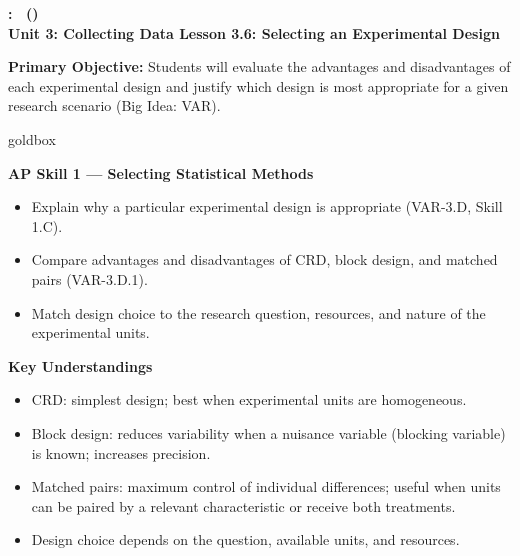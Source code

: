 \documentclass[10pt]{article}
\newcommand{\UnitNumberName}{Unit 3: Collecting Data \quad}
\newcommand{\LessonNumberName}{Lesson 3.6: Selecting an Experimental Design}
\begin{document}
\begin{center}
    {\Large\bfseries \CourseName: \SchoolYear\ (\MeetingLength) \\
    {\small\bfseries \UnitNumberName \LessonNumberName}}
\end{center}

\begin{tcolorbox}[colback=sky, colframe=navy, boxrule=0.9pt, arc=2mm,
    left=2mm, right=2mm, top=1.5mm, bottom=1.5mm]
    \textbf{Primary Objective:} Students will evaluate the advantages and disadvantages
    of each experimental design and justify which design is most appropriate for a
    given research scenario (Big Idea: VAR).
\end{tcolorbox}

\renewcommand{\arraystretch}{1.6}
\begin{skillbox}{goldbox}
\begin{minipage}[t]{0.48\linewidth}
    \textbf{AP Skill 1 --- Selecting Statistical Methods}
    \begin{itemize}
        \item Explain why a particular experimental design is appropriate (VAR-3.D,
              Skill 1.C).
        \item Compare advantages and disadvantages of CRD, block design, and matched
              pairs (VAR-3.D.1).
        \item Match design choice to the research question, resources, and
              nature of the experimental units.
    \end{itemize}
\end{minipage}
\hfill
\begin{minipage}[t]{0.48\linewidth}
    \textbf{Key Understandings}
    \begin{itemize}
        \item CRD: simplest design; best when experimental units are homogeneous.
        \item Block design: reduces variability when a nuisance variable (blocking
              variable) is known; increases precision.
        \item Matched pairs: maximum control of individual differences; useful when
              units can be paired by a relevant characteristic or receive both
              treatments.
        \item Design choice depends on the question, available units, and resources.
    \end{itemize}
\end{minipage}
\end{skillbox}
\end{document}

